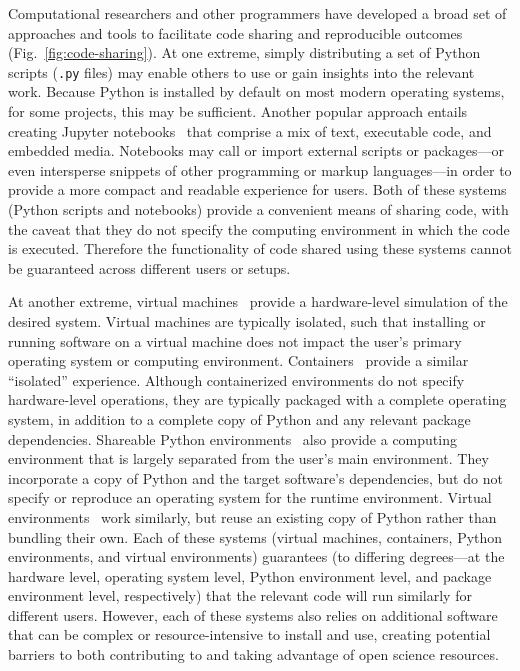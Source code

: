 \documentclass[preprint,12pt,a4paper]{elsarticle}
\begin{document}
Computational researchers and other programmers have de\-vel\-oped a
broad set of approaches and tools to facilitate code sharing and
reproducible outcomes (Fig.~\ref{fig:code-sharing}). At one extreme,
simply distributing a set of Python scripts (\texttt{.py} files) may
enable others to use or gain insights into the relevant work. Because
Python is installed by default on most modern operating systems, for
some projects, this may be sufficient. Another popular approach
entails creating Jupyter notebooks~\cite{KluyEtal16} that comprise a
mix of text, executable code, and embedded media. Notebooks may call
or import external scripts or packages---or even intersperse snippets
of other programming or markup lang\-uages---in order to provide a
more compact and readable experience for users. Both of these systems
(Python scripts and notebooks) provide a convenient means of sharing
code, with the caveat that they do not specify the computing
environment in which the code is executed. Therefore the functionality
of code shared using these systems cannot be guaranteed across
different users or setups.

At another extreme, virtual machines~\cite{Gold74, AltiEtal05, Rose99}
provide a hardware-level simulation of the desired system.  Virtual
machines are typically isolated, such that installing or running
software on a virtual machine does not impact the user's primary
operating system or computing environment.
Containers~\cite[e.g.,][]{Merk14, KurtEtal17} provide a similar
``isolated'' experience. Although containerized environments do not
specify hardware-level operations, they are typically packaged with a
complete operating system, in addition to a complete copy of Python
and any relevant package dependencies. Shareable Python
environments~\cite[e.g.,][]{Anac12} also provide a computing
environment that is largely separated from the user's main
environment. They incorporate a copy of Python and the target
software's dependencies, but do not specify or
reproduce an operating system for the runtime environment.
Virtual environments~\cite[e.g.,][]{BickEtal07, Eust19} work similarly, but
reuse an existing copy of Python rather than bundling their own.
Each of these systems (virtual machines, containers, Python environments, and virtual environments)
guarantees (to differing degrees---at the hardware level, operating
system level, Python environment level, and package environment level, respectively) that the
relevant code will run similarly for different users. However, each of
these systems also relies on additional software that can be complex
or resource-intensive to install and use, creating potential barriers
to both contributing to and taking advantage of open science
resources.
\end{document}

